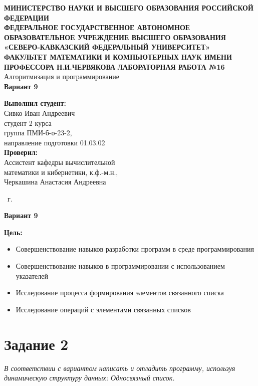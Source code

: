 \documentclass[14pt,a4paper]{article}
\begin{document}
\begin{titlepage}
\begin{center}
{\large\scshape\bfseries
МИНИСТЕРСТВО НАУКИ И ВЫСШЕГО ОБРАЗОВАНИЯ РОССИЙСКОЙ ФЕДЕРАЦИИ\\
ФЕДЕРАЛЬНОЕ ГОСУДАРСТВЕННОЕ АВТОНОМНОЕ ОБРАЗОВАТЕЛЬНОЕ УЧРЕЖДЕНИЕ ВЫСШЕГО ОБРАЗОВАНИЯ\\
«СЕВЕРО-КАВКАЗСКИЙ ФЕДЕРАЛЬНЫЙ УНИВЕРСИТЕТ»\\
ФАКУЛЬТЕТ МАТЕМАТИКИ И КОМПЬЮТЕРНЫХ НАУК ИМЕНИ ПРОФЕССОРА Н.И.ЧЕРВЯКОВА}
\vfill
\Large{\textbf{ЛАБОРАТОРНАЯ РАБОТА №16}}\\[2mm]
\large{Алгоритмизация и программирование}\\[6mm]
\Large{\textbf{Вариант 9}}\\[20mm]
\end{center}
\begin{flushright}
\large{
\textbf{Выполнил студент:}\\
Сивко Иван Андреевич\\
студент 2 курса\\
группа ПМИ-б-о-23-2,\\
направление подготовки 01.03.02\\[5mm]
\textbf{Проверил:}\\
Ассистент кафедры вычислительной\\
математики и кибернетики, к.ф.-м.н.,\\
Черкашина Анастасия Андреевна}
\end{flushright}
\vfill
\centerline{ \the\year\ г. }
\end{titlepage}


\centerline{\large\textbf{Вариант 9}}
\large{\textbf{Цель:}}
\begin{small}
\begin{itemize}
\item{Совершенствование навыков разработки программ в среде программирования}
\item{Совершенствование навыков в программировании с использованием указателей}
\item{Исследование процесса формирования элементов связанного списка}
\item{Исследование операций с элементами связанных списков}
\end{itemize}
\end{small}

\section*{Задание 2}
\textit{В соответствии с вариантом написать и отладить программу, используя
динамическую структуру данных: Односвязный список.}
\renewcommand{\thesubsection}{\arabic{subsection}} %
\setcounter{subsection}{0} %
\end{document}
